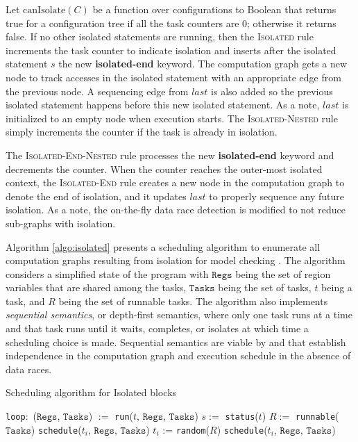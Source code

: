 Let $\mathrm{canIsolate}(C)$ be a function over configurations to Boolean that returns true for a configuration tree if all the task counters are 0; otherwise it returns false. If no other isolated statements are running, then the \textsc{Isolated} rule increments the task counter to indicate isolation and inserts after the isolated statement $\mathit{s}$ the new \textbf{isolated-end} keyword. The computation graph gets a new node to track accesses in the isolated statement with an appropriate edge from the previous node. A sequencing edge from $\mathit{last}$ is also added so the previous isolated statement happens before this new isolated statement. As a note, $\mathit{last}$ is initialized to an empty node when execution starts. The \textsc{Isolated-Nested} rule simply increments the counter if the task is already in isolation.

The \textsc{Isolated-End-Nested} rule processes the new \textbf{isolated-end} keyword and decrements the counter. When the counter reaches the outer-most isolated context, the \textsc{Isolated-End} rule creates a new node in the computation graph to denote the end of isolation, and it updates $\mathit{last}$ to properly sequence any future isolation. As a note, the on-the-fly data race detection is modified to not reduce sub-graphs with isolation.

Algorithm \ref{algo:isolated} presents a scheduling algorithm to enumerate all computation graphs resulting from isolation for model checking \cite{mercer2015model}. The algorithm considers a simplified state of the program with $\mathtt{Regs}$ being the set of region variables that are shared among the tasks, $\mathtt{Tasks}$ being the set of tasks, $t$ being a task, and $R$ being the set of runnable tasks. The algorithm also implements \emph{sequential semantics}, or depth-first semantics, where only one task runs at a time and that task runs until it waits, completes, or isolates at which time a scheduling choice is made. Sequential semantics are viable by  and  that establish independence in the computation graph and execution schedule in the absence of data races. 

\begin{algorithm}
\caption{Scheduling algorithm for Isolated blocks} \label{algo:isolated}
\begin{algorithmic}[1]
  \State \texttt{loop}:\ ($\mathtt{Regs}$, $\mathtt{Tasks}$) $:=$ \texttt{run}($t$, $\mathtt{Regs}$, $\mathtt{Tasks}$)\label{loc:run}
  \State $s :=$ \texttt{status}($t$)
  \State $R :=$ \texttt{runnable}($\mathtt{Tasks}$)
  \label{loc:entry:isolated}
  \label{loc:prsched}
  \State \texttt{schedule}($t_i$, $\mathtt{Regs}$, $\mathtt{Tasks}$)
  \EndFor
  \Else
  \State $t_i$ := \texttt{random}($R$)\label{loc:rand}
  \State \texttt{schedule}($t_i$, $\mathtt{Regs}$, $\mathtt{Tasks}$)
  \EndIf
  \EndFunction
\end{algorithmic}
\end{algorithm}


